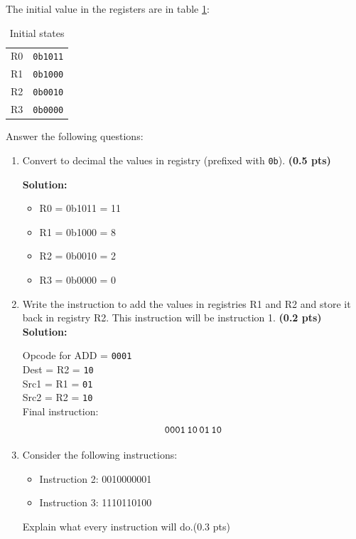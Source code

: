 \documentclass[10pt]{article}
\providecommand{\textt}[1]{\texttt{#1}}
\begin{document}
The initial value in the registers are in table \ref{tab:initial_state}: 

\begin{table}[H]
    \begin{tabular}{ll}
        R0 & \textt{0b1011}\\
        R1 & \textt{0b1000}\\
        R2 & \textt{0b0010}\\
        R3 & \textt{0b0000} \\ 
    \end{tabular}
    \caption{Initial states}
    \label{tab:initial_state}
\end{table}



Answer the following questions: 
\begin{enumerate}
    \item Convert to decimal the values in registry (prefixed with \verb|0b|). \textbf{(0.5 pts)}
    
    \textbf{Solution:}
    \begin{itemize}
        \item R0 = 0b1011 = 11
        \item R1 = 0b1000 = 8
        \item R2 = 0b0010 = 2
        \item R3 = 0b0000 = 0
    \end{itemize}
    \item Write the instruction to add the values in registries R1 and R2 and store it back in registry R2. This instruction will be instruction 1. \textbf{(0.2 pts)}\\
    
    \textbf{Solution:}
    
    Opcode for ADD = \texttt{0001}\\
    Dest = R2 = \texttt{10}\\
    Src1 = R1 = \texttt{01}\\
    Src2 = R2 = \texttt{10}\\
    
    Final instruction:
    \[
    \texttt{0001\,10\,01\,10}
    \]

    \item Consider the following instructions:
    \begin{itemize}
        \item Instruction 2: 0010000001
        \item Instruction 3: 1110110100
    \end{itemize}
    Explain what every instruction will do.(0.3 pts)


\end{enumerate}
\end{document}
